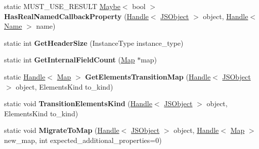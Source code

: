\begin{DoxyCompactItemize}
\item 
static M\+U\+S\+T\+\_\+\+U\+S\+E\+\_\+\+R\+E\+S\+U\+LT \hyperlink{classv8_1_1_maybe}{Maybe}$<$ bool $>$ {\bfseries Has\+Real\+Named\+Callback\+Property} (\hyperlink{classv8_1_1internal_1_1_handle}{Handle}$<$ \hyperlink{classv8_1_1internal_1_1_j_s_object}{J\+S\+Object} $>$ object, \hyperlink{classv8_1_1internal_1_1_handle}{Handle}$<$ \hyperlink{classv8_1_1internal_1_1_name}{Name} $>$ name)\hypertarget{classv8_1_1internal_1_1_j_s_object_af23b4c4843278854fc1701332f8468f1}{}\label{classv8_1_1internal_1_1_j_s_object_af23b4c4843278854fc1701332f8468f1}

\item 
static int {\bfseries Get\+Header\+Size} (Instance\+Type instance\+\_\+type)\hypertarget{classv8_1_1internal_1_1_j_s_object_a21986765b349a5f385eb67166081c865}{}\label{classv8_1_1internal_1_1_j_s_object_a21986765b349a5f385eb67166081c865}

\item 
static int {\bfseries Get\+Internal\+Field\+Count} (\hyperlink{classv8_1_1internal_1_1_map}{Map} $\ast$map)\hypertarget{classv8_1_1internal_1_1_j_s_object_a2089409f8b44c3f51dadebf4bc0b60da}{}\label{classv8_1_1internal_1_1_j_s_object_a2089409f8b44c3f51dadebf4bc0b60da}

\item 
static \hyperlink{classv8_1_1internal_1_1_handle}{Handle}$<$ \hyperlink{classv8_1_1internal_1_1_map}{Map} $>$ {\bfseries Get\+Elements\+Transition\+Map} (\hyperlink{classv8_1_1internal_1_1_handle}{Handle}$<$ \hyperlink{classv8_1_1internal_1_1_j_s_object}{J\+S\+Object} $>$ object, Elements\+Kind to\+\_\+kind)\hypertarget{classv8_1_1internal_1_1_j_s_object_a97f098221e983f00c111222572171de4}{}\label{classv8_1_1internal_1_1_j_s_object_a97f098221e983f00c111222572171de4}

\item 
static void {\bfseries Transition\+Elements\+Kind} (\hyperlink{classv8_1_1internal_1_1_handle}{Handle}$<$ \hyperlink{classv8_1_1internal_1_1_j_s_object}{J\+S\+Object} $>$ object, Elements\+Kind to\+\_\+kind)\hypertarget{classv8_1_1internal_1_1_j_s_object_a62f3dbe23fd6c8eff78781d2a95cb8cb}{}\label{classv8_1_1internal_1_1_j_s_object_a62f3dbe23fd6c8eff78781d2a95cb8cb}

\item 
static void {\bfseries Migrate\+To\+Map} (\hyperlink{classv8_1_1internal_1_1_handle}{Handle}$<$ \hyperlink{classv8_1_1internal_1_1_j_s_object}{J\+S\+Object} $>$ object, \hyperlink{classv8_1_1internal_1_1_handle}{Handle}$<$ \hyperlink{classv8_1_1internal_1_1_map}{Map} $>$ new\+\_\+map, int expected\+\_\+additional\+\_\+properties=0)\hypertarget{classv8_1_1internal_1_1_j_s_object_ab60efe6c24eef80f411f54d9c6d89771}{}\label{classv8_1_1internal_1_1_j_s_object_ab60efe6c24eef80f411f54d9c6d89771}


\end{DoxyCompactItemize}
